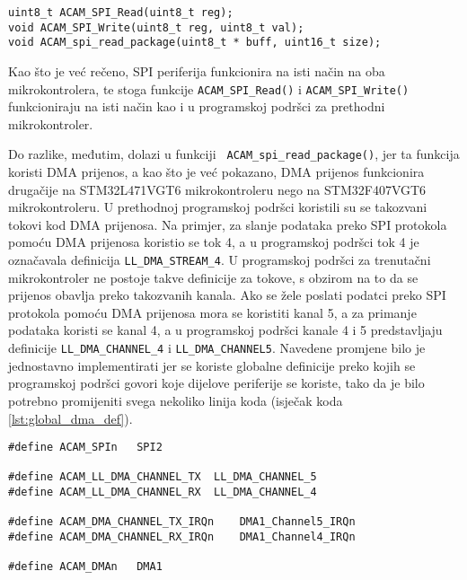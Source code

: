 \begin{lstlisting}[caption=Funkcije za rad s SPI periferijom, label={lst:acam_spi_functions}]
uint8_t ACAM_SPI_Read(uint8_t reg);
void ACAM_SPI_Write(uint8_t reg, uint8_t val);
void ACAM_spi_read_package(uint8_t * buff, uint16_t size);
\end{lstlisting}

\noindent Kao što je već rečeno, SPI periferija funkcionira na isti način na oba mikrokontrolera, te stoga funkcije \verb|ACAM_SPI_Read()| i \verb|ACAM_SPI_Write()| funkcioniraju na isti način kao i u programskoj podršci za prethodni mikrokontroler.

Do razlike, međutim, dolazi u funkciji \verb| ACAM_spi_read_package()|, jer ta funkcija koristi DMA prijenos, a kao što je već pokazano, DMA prijenos funkcionira drugačije na STM32L471VGT6 mikrokontroleru nego na STM32F407VGT6 mikrokontroleru. U prethodnoj programskoj podršci koristili su se takozvani tokovi kod DMA prijenosa. Na primjer, za slanje podataka preko SPI protokola pomoću DMA prijenosa koristio se tok 4, a u programskoj podršci tok 4 je označavala definicija \verb|LL_DMA_STREAM_4|. U programskoj podršci za trenutačni mikrokontroler ne postoje takve definicije za tokove, s obzirom na to da se prijenos obavlja preko takozvanih kanala. Ako se žele poslati podatci preko SPI protokola pomoću DMA prijenosa mora se koristiti kanal 5, a za primanje podataka koristi se kanal 4, a u programskoj podršci kanale 4 i 5 predstavljaju definicije \verb|LL_DMA_CHANNEL_4| i \verb|LL_DMA_CHANNEL5|. Navedene promjene bilo je jednostavno implementirati jer se koriste globalne definicije preko kojih se programskoj podršci govori koje dijelove periferije se koriste, tako da je bilo potrebno promijeniti svega nekoliko linija koda (isječak koda \ref{lst:global_dma_def}).
\begin{lstlisting}[caption=Zaglavlje dma.h datoteke u kojima se definira koji dijelovi periferija se koriste, label={lst:global_dma_def}]
#define ACAM_SPIn	SPI2

#define ACAM_LL_DMA_CHANNEL_TX	LL_DMA_CHANNEL_5
#define ACAM_LL_DMA_CHANNEL_RX	LL_DMA_CHANNEL_4

#define ACAM_DMA_CHANNEL_TX_IRQn	DMA1_Channel5_IRQn
#define ACAM_DMA_CHANNEL_RX_IRQn	DMA1_Channel4_IRQn

#define ACAM_DMAn	DMA1
\end{lstlisting}

